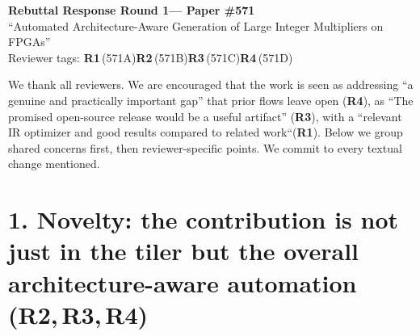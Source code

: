 \documentclass[10pt]{article}
\newcommand{\Ra}{\textbf{\textcolor{c1}{R1}}}
\newcommand{\Rb}{\textbf{\textcolor{c2}{R2}}}
\newcommand{\Rc}{\textbf{\textcolor{c3}{R3}}}
\newcommand{\Rd}{\textbf{\textcolor{c4}{R4}}}
\begin{document}
\begin{center}
{\large\bfseries Rebuttal Response Round 1--- Paper \#571}\\[2pt]
{\small ``Automated Architecture-Aware Generation of Large Integer Multipliers on FPGAs''}\\[2pt]
{\footnotesize Reviewer tags: \Ra\,(571A)\quad \Rb\,(571B)\quad \Rc\,(571C)\quad \Rd\,(571D)}
\end{center}

\vspace{2pt}
We thank all reviewers.
We are encouraged that the work is seen as addressing ``a genuine and practically important gap'' that prior flows leave open (\Rd), as ``The promised open-source release would be a useful artifact'' (\Rc), with a ``relevant IR optimizer and good results compared to related work``(\Ra).
Below we group shared concerns first, then reviewer-specific points.
We commit to every textual change mentioned.

\section*{1. Novelty: the contribution is not just in the tiler but the overall architecture-aware automation \hfill {\normalsize(\Rb,\,\Rc,\,\Rd)}}
\end{document}
